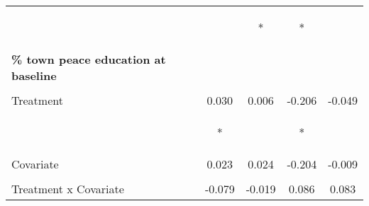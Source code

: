 \begin{tabular}{lcccc}
 & \begin{footnotesize}[0.024]\end{footnotesize} & \begin{footnotesize}[0.012]*\end{footnotesize} & \begin{footnotesize}[0.130]*\end{footnotesize} & \begin{footnotesize}[0.128]\end{footnotesize}\\
\noalign{\smallskip}\textbf{\% town peace education at baseline} &  &  &  & \\
 & \begin{footnotesize}\end{footnotesize} & \begin{footnotesize}\end{footnotesize} & \begin{footnotesize}\end{footnotesize} & \begin{footnotesize}\end{footnotesize}\\
\noalign{\smallskip}Treatment & 0.030 & 0.006 & -0.206 & -0.049\\
 & \begin{footnotesize}[0.017]*\end{footnotesize} & \begin{footnotesize}[0.007]\end{footnotesize} & \begin{footnotesize}[0.106]*\end{footnotesize} & \begin{footnotesize}[0.097]\end{footnotesize}\\
\noalign{\smallskip}Covariate & 0.023 & 0.024 & -0.204 & -0.009\\
 & \begin{footnotesize}[0.038]\end{footnotesize} & \begin{footnotesize}[0.017]\end{footnotesize} & \begin{footnotesize}[0.260]\end{footnotesize} & \begin{footnotesize}[0.194]\end{footnotesize}\\
\noalign{\smallskip}Treatment x Covariate & -0.079 & -0.019 & 0.086 & 0.083\\

\end{tabular}
